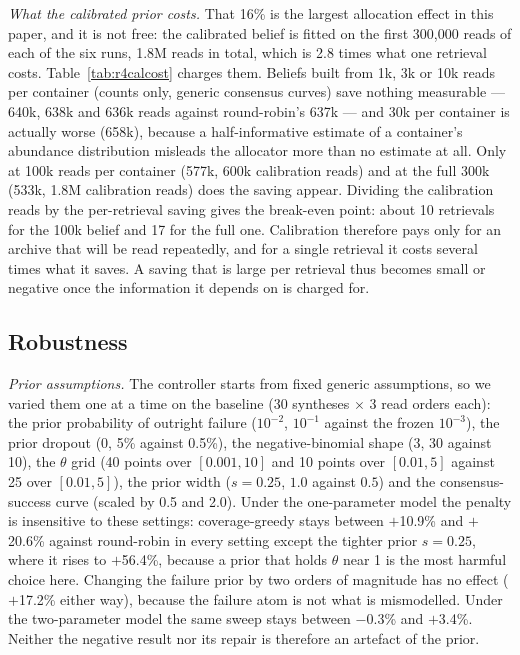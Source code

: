 \documentclass[conference,onecolumn,11pt]{IEEEtran}
\begin{document}

\emph{What the calibrated prior costs.}  That 16\% is the largest allocation effect in this paper, and
it is not free: the calibrated belief is fitted on the first 300{,}000 reads of each of the six runs,
1.8M reads in total, which is 2.8 times what one retrieval costs.  Table~\ref{tab:r4calcost} charges
them.  Beliefs built from 1k, 3k or 10k reads per container (counts only, generic consensus curves)
save nothing measurable --- 640k, 638k and 636k reads against round-robin's 637k --- and 30k per
container is actually worse (658k), because a half-informative estimate of a container's abundance
distribution misleads the allocator more than no estimate at all.  Only at 100k reads per container
(577k, 600k calibration reads) and at the full 300k (533k, 1.8M calibration reads) does the saving
appear.  Dividing the calibration reads by the per-retrieval saving gives the break-even point: about
10 retrievals for the 100k belief and 17 for the full one.  Calibration therefore pays only for an
archive that will be read repeatedly, and for a single retrieval it costs several times what it saves.
A saving that is large per retrieval thus becomes small or negative once the information it depends on
is charged for.

\subsection{Robustness}\label{sec:res-robust}

\emph{Prior assumptions.}  The controller starts from fixed generic assumptions, so we varied them one
at a time on the baseline (30 syntheses $\times$ 3 read orders each): the prior probability of outright
failure ($10^{-2}$, $10^{-1}$ against the frozen $10^{-3}$), the prior dropout (0, 5\% against 0.5\%),
the negative-binomial shape (3, 30 against 10), the $\theta$ grid (40 points over $[0.001,10]$ and 10
points over $[0.01,5]$ against 25 over $[0.01,5]$), the prior width ($s{=}0.25$, $1.0$ against $0.5$)
and the consensus-success curve (scaled by 0.5 and 2.0).  Under the one-parameter model the penalty is
insensitive to these settings: coverage-greedy stays between $+$10.9\% and $+$20.6\% against round-robin
in every setting except the tighter prior $s{=}0.25$, where it rises to $+$56.4\%, because a prior that
holds $\theta$ near 1 is the most harmful choice here.  Changing the failure prior by two orders of
magnitude has no effect ($+$17.2\% either way), because the failure atom is not what is mismodelled.
Under the two-parameter model the same sweep stays between $-$0.3\% and $+$3.4\%.  Neither the negative
result nor its repair is therefore an artefact of the prior.
\end{document}
